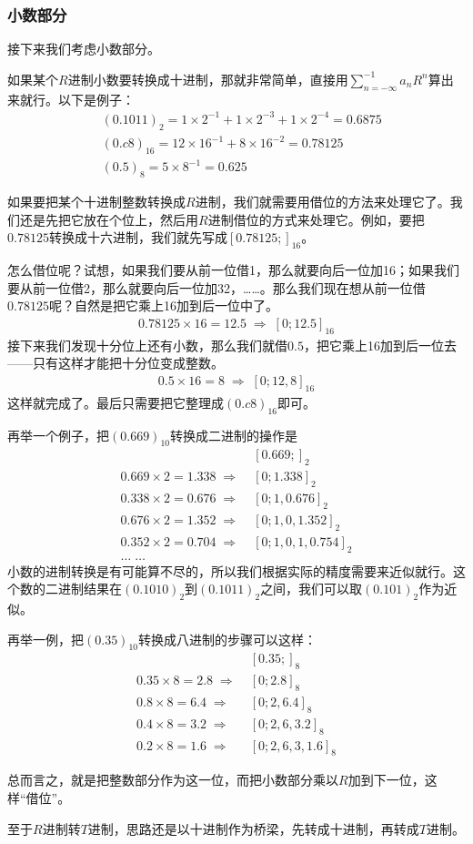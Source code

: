 \subsubsection*{小数部分}
接下来我们考虑小数部分。\par
如果某个$R$进制小数要转换成十进制，那就非常简单，直接用$\sum_{n=-\infty}^{-1}a_nR^n$算出来就行。以下是例子：
\begin{align*}
{}&(0.1011)_2=1\times2^{-1}+1\times2^{-3}+1\times2^{-4}=0.6875\\    
{}&(0.c8)_{16}=12\times16^{-1}+8\times16^{-2}=0.78125\\
{}&(0.5)_8=5\times8^{-1}=0.625
\end{align*}\par
如果要把某个十进制整数转换成$R$进制，我们就需要用借位的方法来处理它了。我们还是先把它放在个位上，然后用$R$进制借位的方式来处理它。例如，要把$0.78125$转换成十六进制，我们就先写成$[0.78125;]_{16}$。\par
怎么借位呢？试想，如果我们要从前一位借1，那么就要向后一位加16；如果我们要从前一位借2，那么就要向后一位加32，……。那么我们现在想从前一位借$0.78125$呢？自然是把它乘上16加到后一位中了。
\begin{align*}
0.78125\times16=12.5\;\Rightarrow\;[0;12.5]_{16}
\end{align*}
接下来我们发现十分位上还有小数，那么我们就借$0.5$，把它乘上16加到后一位去——只有这样才能把十分位变成整数。
\begin{align*}
0.5\times16=8\;\Rightarrow\;[0;12,8]_{16}
\end{align*}
这样就完成了。最后只需要把它整理成$(0.c8)_{16}$即可。\par
再举一个例子，把$(0.669)_{10}$转换成二进制的操作是
\begin{align*}
{}&[0.669;]_2\\
0.669\times2=1.338\;\Rightarrow\;{}&[0;1.338]_2\\
0.338\times2=0.676\;\Rightarrow\;{}&[0;1,0.676]_2\\
0.676\times2=1.352\;\Rightarrow\;{}&[0;1,0,1.352]_2\\
0.352\times2=0.704\;\Rightarrow\;{}&[0;1,0,1,0.754]_2\\
\ldots\;\ldots{}&
\end{align*}
小数的进制转换是有可能算不尽的，所以我们根据实际的精度需要来近似就行。这个数的二进制结果在$(0.1010)_2$到$(0.1011)_2$之间，我们可以取$(0.101)_2$作为近似。\par
再举一例，把$(0.35)_{10}$转换成八进制的步骤可以这样：
\begin{align*}
{}&[0.35;]_8\\
0.35\times8=2.8\;\Rightarrow\;{}&[0;2.8]_8\\
0.8\times8=6.4\;\Rightarrow\;{}&[0;2,6.4]_8\\
0.4\times8=3.2\;\Rightarrow\;{}&[0;2,6,3.2]_8\\
0.2\times8=1.6\;\Rightarrow\;{}&[0;2,6,3,1.6]_8
\end{align*}\par
总而言之，就是把整数部分作为这一位，而把小数部分乘以$R$加到下一位，这样``借位''。\par
至于$R$进制转$T$进制，思路还是以十进制作为桥梁，先转成十进制，再转成$T$进制。\par
